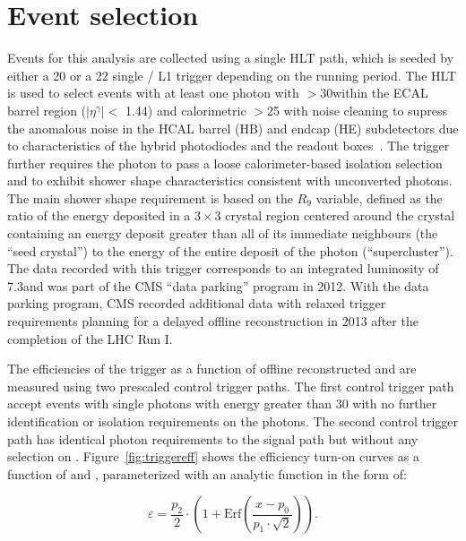 \section{Event selection}
\label{sec:event_selection}
Events for this analysis are collected using a single HLT path, which is seeded by either a 20 \GeV or a 22 \GeV single \Pe/\Pgg\xspace L1 trigger depending on the running period. The HLT is used to select events with at least one photon with \et$ > 30$\GeV within the ECAL barrel region ($|\eta^{\gamma}| < $ 1.44) and calorimetric \met $ > $25 \GeV with noise cleaning to supress the anomalous noise in the HCAL barrel (HB) and endcap (HE) subdetectors due to characteristics of the hybrid photodiodes and the readout boxes~\cite{hcalnoise}. The trigger further requires the photon to pass a loose calorimeter-based isolation selection and to exhibit shower shape characteristics consistent with unconverted photons. The main shower shape requirement is based on the $R_{9}$ variable, defined as the ratio of the energy deposited in a $3\times 3$ crystal region centered around the crystal containing an energy deposit greater than all of its immediate neighbours (the ``seed crystal'')  to the energy of the entire deposit of the photon (``supercluster''). The data recorded with this trigger corresponds to an integrated luminosity of 7.3\fbinv and was part of the CMS ``data parking'' program in 2012. With the data parking program, CMS recorded additional data with relaxed trigger requirements planning for a delayed offline reconstruction in 2013 after the completion of the LHC Run I. %

 The efficiencies of the trigger as a function of offline reconstructed \etg and \met are measured using two prescaled control trigger paths. The first control trigger path accept events with single photons with energy greater than 30 \GeV with no further identification or isolation requirements on the photons. The second control trigger path has identical photon requirements to the signal path but without any selection on \met. Figure~\ref{fig:triggereff} shows the efficiency turn-on curves as a function of \etg and \met, parameterized with an analytic function in the form of:

\begin{equation}                                                                                                                                                                  
\label{eq:acc}                                                                                                                                                                    
        \varepsilon = \frac{p_2}{2} \cdot \left( 1 + \text{Erf}\left(\frac{x - p_0}{p_1 \cdot \sqrt{2}}\right)\right).
\end{equation}            

